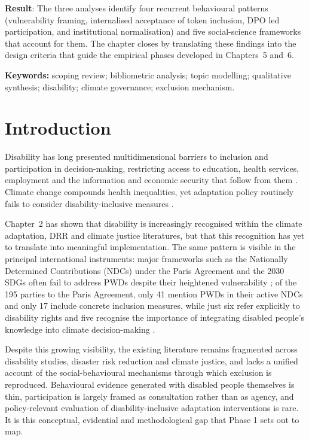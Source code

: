 \documentclass[12pt,a4paper]{report}
\begin{document}
\noindent\textbf{Result}: The three analyses identify four recurrent behavioural patterns (vulnerability framing, internalised acceptance of token inclusion, DPO led participation, and institutional normalisation) and five social-science frameworks that account for them. The chapter closes by translating these findings into the design criteria that guide the empirical phases developed in Chapters~5 and~6.

\vspace{0.3cm}
\noindent\textbf{Keywords:} scoping review; bibliometric analysis; topic modelling; qualitative synthesis; disability; climate governance; exclusion mechanism.

\clearpage
\section{Introduction}
Disability has long presented multidimensional barriers to inclusion and participation in decision-making, restricting access to education, health services, employment and the information and economic security that follow from them \cite{trani2018realization}. Climate change compounds health inequalities, yet adaptation policy routinely fails to consider disability-inclusive measures \cite{wilbur2025climate}.

Chapter~2 has shown that disability is increasingly recognised within the climate adaptation, DRR and climate justice literatures, but that this recognition has yet to translate into meaningful implementation. The same pattern is visible in the principal international instruments: major frameworks such as the Nationally Determined Contributions (NDCs) under the Paris Agreement and the 2030 SDGs often fail to address PWDs despite their heightened vulnerability \cite{evmorfidis2026climate}; of the 195 parties to the Paris Agreement, only 41 mention PWDs in their active NDCs and only 17 include concrete inclusion measures, while just six refer explicitly to disability rights and five recognise the importance of integrating disabled people's knowledge into climate decision-making \cite{jodoin2025systematic,cabo_verde_ndc_2021,maldives_ndc_2020,vietnam_ndc_2022}.

Despite this growing visibility, the existing literature remains fragmented across disability studies, disaster risk reduction and climate justice, and lacks a unified account of the social-behavioural mechanisms through which exclusion is reproduced. Behavioural evidence generated with disabled people themselves is thin, participation is largely framed as consultation rather than as agency, and policy-relevant evaluation of disability-inclusive adaptation interventions is rare. It is this conceptual, evidential and methodological gap that Phase 1 sets out to map.
\end{document}
